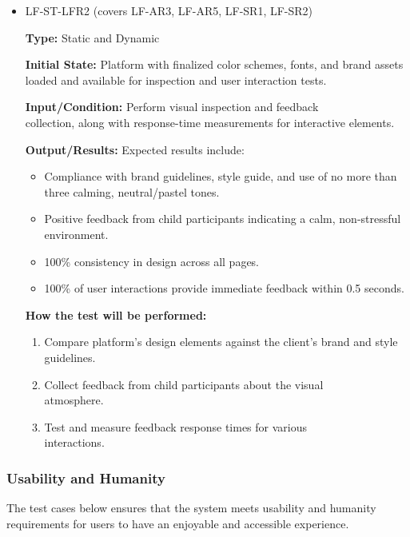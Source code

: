 \documentclass[12pt, titlepage]{article}
\begin{document}
\begin{itemize}
  \item LF-ST-LFR2 (covers LF-AR3, LF-AR5, LF-SR1, LF-SR2)
  \begin{mdframed}[linewidth=0.5mm] 
    \textbf{Type:} Static and Dynamic \par 
    \textbf{Initial State:} Platform with finalized color schemes, fonts, and brand assets loaded and available for inspection and user interaction tests. \par 
    \textbf{Input/Condition:} Perform visual inspection and feedback \\collection, along with response-time measurements for interactive elements. \par 
    \textbf{Output/Results:} Expected results include: 
    \begin{itemize} 
      \item Compliance with brand guidelines, style guide, and use of no more than three calming, neutral/pastel tones. 
      \item Positive feedback from child participants indicating a calm, non-stressful environment. 
      \item 100\% consistency in design across all pages. 
      \item 100\% of user interactions provide immediate feedback within 0.5 seconds. 
    \end{itemize} \par 
    \textbf{How the test will be performed:} 
    \begin{enumerate}[noitemsep] 
      \item Compare platform’s design elements against the client’s brand and style guidelines. 
      \item Collect feedback from child participants about the visual \\atmosphere. 
      \item Test and measure feedback response times for various \\interactions. 
    \end{enumerate} 
  \end{mdframed} 
\end{itemize}

\subsubsection{Usability and Humanity}
\hspace{2em}The test cases below ensures that the system meets usability and humanity
requirements for users to have an enjoyable and accessible experience.
\end{document}
